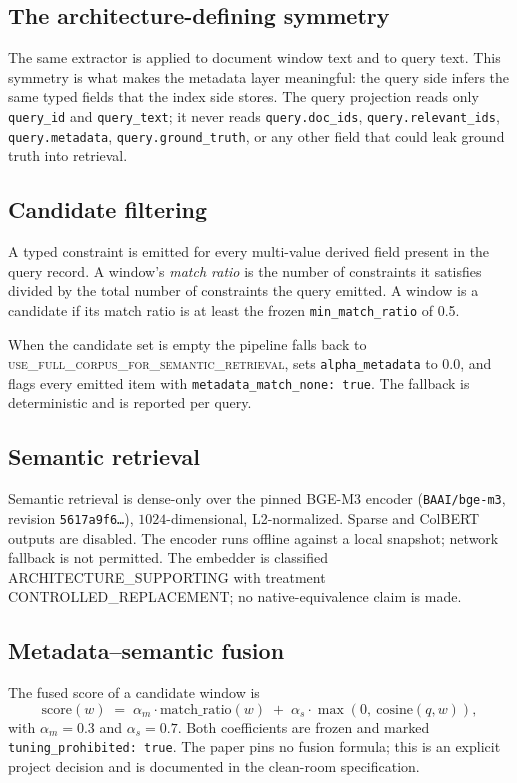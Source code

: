 \documentclass[11pt,a4paper]{article}
\begin{document}
\subsection{The architecture-defining symmetry}
The same extractor is applied to document window text and to query
text. This symmetry is what makes the metadata layer meaningful: the
query side infers the same typed fields that the index side stores.
The query projection reads only \texttt{query\_id} and
\texttt{query\_text}; it never reads \texttt{query.doc\_ids},
\texttt{query.relevant\_ids}, \texttt{query.metadata},
\texttt{query.ground\_truth}, or any other field that could leak
ground truth into retrieval.

\subsection{Candidate filtering}
A typed constraint is emitted for every multi-value derived field
present in the query record. A window's \emph{match ratio} is the
number of constraints it satisfies divided by the total number of
constraints the query emitted. A window is a candidate if its match
ratio is at least the frozen \texttt{min\_match\_ratio} of \num{0.5}.

When the candidate set is empty the pipeline falls back to
\textsc{use\_full\_corpus\_for\_semantic\_retrieval}, sets
\texttt{alpha\_metadata} to \num{0.0}, and flags every emitted item
with \texttt{metadata\_match\_none: true}. The fallback is
deterministic and is reported per query.

\subsection{Semantic retrieval}
Semantic retrieval is dense-only over the pinned BGE-M3 encoder
(\texttt{BAAI/bge-m3}, revision
\texttt{5617a9f6\ldots}), $1024$-dimensional, L2-normalized. Sparse
and ColBERT outputs are disabled. The encoder runs offline against a
local snapshot; network fallback is not permitted. The embedder is
classified \textsc{ARCHITECTURE\_SUPPORTING} with treatment
\textsc{CONTROLLED\_REPLACEMENT}; no native-equivalence claim is
made.

\subsection{Metadata--semantic fusion}
The fused score of a candidate window is
\[
\mathrm{score}(w) \;=\; \alpha_m \cdot \mathrm{match\_ratio}(w)
\;+\; \alpha_s \cdot \max(0,\ \mathrm{cosine}(q, w)),
\]
with $\alpha_m = \num{0.3}$ and $\alpha_s = \num{0.7}$. Both
coefficients are frozen and marked
\texttt{tuning\_prohibited: true}. The paper pins no fusion
formula; this is an explicit project decision and is documented in
the clean-room specification.
\end{document}
